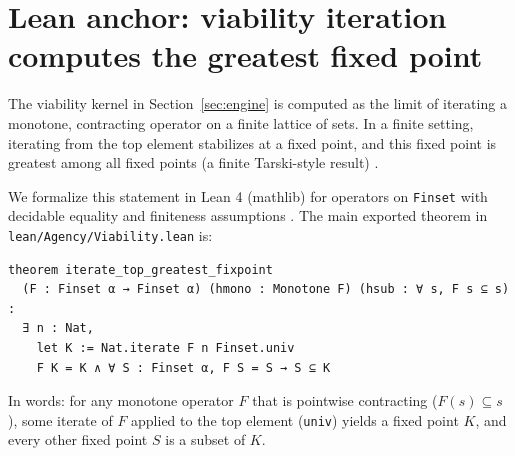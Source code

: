 \documentclass[11pt]{article}
\begin{document}
\appendix
\section{Lean anchor: viability iteration computes the greatest fixed point}
\label{app:lean_viability}

The viability kernel in Section~\ref{sec:engine} is computed as the limit of iterating a monotone, contracting operator on a finite lattice of sets. In a finite setting, iterating from the top element stabilizes at a fixed point, and this fixed point is greatest among all fixed points (a finite Tarski-style result) \citep{tarski1955}.

We formalize this statement in Lean 4 (mathlib) for operators on \texttt{Finset} with decidable equality and finiteness assumptions \citep{demoura2021lean4,mathlib2019}. The main exported theorem in \texttt{lean/Agency/Viability.lean} is:

\begin{verbatim}
theorem iterate_top_greatest_fixpoint
  (F : Finset α → Finset α) (hmono : Monotone F) (hsub : ∀ s, F s ⊆ s) :
  ∃ n : Nat,
    let K := Nat.iterate F n Finset.univ
    F K = K ∧ ∀ S : Finset α, F S = S → S ⊆ K
\end{verbatim}

In words: for any monotone operator $F$ that is pointwise contracting ($F(s)\subseteq s$), some iterate of $F$ applied to the top element (\texttt{univ}) yields a fixed point $K$, and every other fixed point $S$ is a subset of $K$.
 \clearpage


\end{document}
